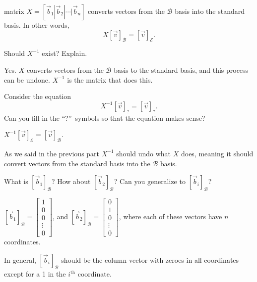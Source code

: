 \documentclass{problemset}
\newcommand{\matc}[1]{\begin{bmatrix}#1\end{bmatrix}}
\begin{document}
	matrix $X=[\vec b_1|\vec b_2|\cdots|\vec b_n]$ converts
	vectors from the $\mathcal B$ basis into the standard basis. In other words,
	\[
		X[\vec v]_{\mathcal B} = [\vec v]_{\mathcal E}.
	\]
	\begin{parts}
		\item Should $X^{-1}$ exist? Explain.
			\begin{solution}
				Yes. $X$ converts vectors from the
				$\mathcal B$ basis to the standard basis, and this process can be undone.
				$X^{-1}$ is the matrix that does this.
			\end{solution}
		\item Consider the equation
			\[
				X^{-1}[\vec v]_{?} = [\vec v]_{?}.
			\]
			Can you fill in the ``?''~symbols so that the equation makes sense?
			\begin{solution}
				$X^{-1}[\vec v]_{\mathcal E} = [\vec v]_{\mathcal B}$.

				As we said in the previous part $X^{-1}$ should undo what $X$ does,
				meaning it should convert vectors from the standard basis into
				the $\mathcal B$ basis.
			\end{solution}
		\item What is $[\vec b_1]_{\mathcal B}$?  How about $[\vec b_2]_{\mathcal B}$?  Can
			you generalize to $[\vec b_i]_{\mathcal B}$?
			\begin{solution}
				$[\vec b_1]_{\mathcal B}=\matc{1\\0\\0\\\vdots\\0}$, and
				$[\vec b_2]_{\mathcal B}=\matc{0\\1\\0\\\vdots\\0}$, where each of
				these vectors have $n$ coordinates.

				In general, $[\vec b_i]_{\mathcal B}$ should be the column vector
				with zeroes in all coordinates except for a 1 in the $i^\text{th}$
				coordinate.
			\end{solution}
	\end{parts}
\end{document}
